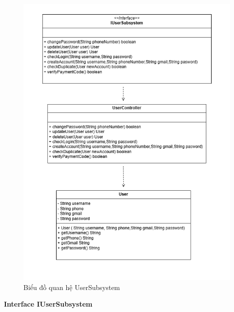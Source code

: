 \begin{figure}[H]
    \centering
    \includegraphics[width=\textwidth]{img3.5/user/quanHe(UserSst).png} 
    \caption{Biểu đồ quan hệ UserSubsystem}
\end{figure}
\textbf{Interface IUserSubsystem}
